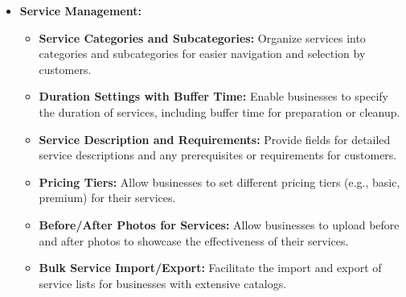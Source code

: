 \begin{itemize}[leftmargin=*]
    \item \textbf{Service Management:}
    \begin{itemize}
        \item \textbf{Service Categories and Subcategories:} Organize services into categories and subcategories for easier navigation and selection by customers.
        \item \textbf{Duration Settings with Buffer Time:} Enable businesses to specify the duration of services, including buffer time for preparation or cleanup.
        \item \textbf{Service Description and Requirements:} Provide fields for detailed service descriptions and any prerequisites or requirements for customers.
        \item \textbf{Pricing Tiers:} Allow businesses to set different pricing tiers (e.g., basic, premium) for their services.
        \item \textbf{Before/After Photos for Services:} Allow businesses to upload before and after photos to showcase the effectiveness of their services.
        \item \textbf{Bulk Service Import/Export:} Facilitate the import and export of service lists for businesses with extensive catalogs.
    \end{itemize}
\end{itemize}
